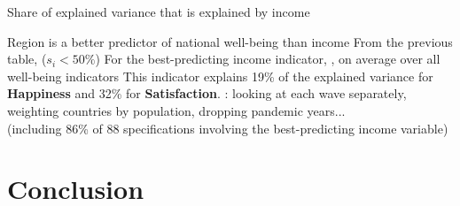 \documentclass[aspectratio=169,xcolor=dvipsnames, 11pt,mathserif]{beamer}
\begin{document}
\begin{frame}{Share of explained variance that is explained by income\label{share_gdp} \hyperlink{share_gdp_add}{}}
    
\end{frame}

\begin{frame}{Region is a better predictor of national well-being than income}
    \bbvsp
    \ip From the previous table,  ($s_i < 50\%$)
    \ip For the best-predicting income indicator, , on average over all well-being indicators
    \ip This indicator explains 19\% of the explained variance for \textbf{Happiness} and 32\% for \textbf{Satisfaction}.
    \ip {}: looking at each wave separately, weighting countries by population, dropping pandemic years... \\(including 86\% of 88 specifications involving the best-predicting income variable) \hyperlink{share_gdp_add}{}
    \ee
\end{frame}

\section{Conclusion}
\end{document}
